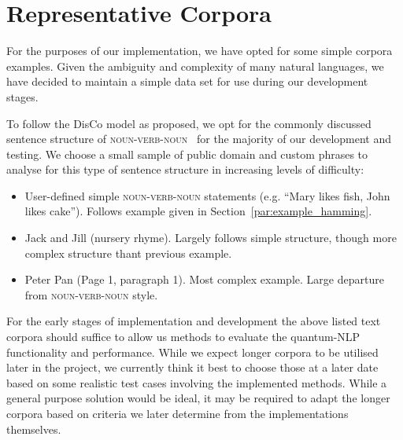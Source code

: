\section{Representative Corpora}
\label{sec:representative_corpora}
For the purposes of our implementation, we have opted for some simple corpora examples. Given the ambiguity and complexity of many natural languages, we have decided to maintain a simple data set for use during our development stages.

To follow the DisCo model as proposed, we opt for the commonly discussed sentence structure of \textsc{noun-verb-noun}~\cite{Zeng_Coecke_2016,Coecke_Sadrzadeh_Clark_2010} for the majority of our development and testing. We choose a small sample of public domain and custom phrases to analyse for this type of sentence structure in increasing levels of difficulty:
\begin{itemize}
    \item User-defined simple \textsc{noun-verb-noun} statements (e.g. ``Mary likes fish, John likes cake''). Follows example given in Section~\ref{par:example_hamming}.
    \item Jack and Jill (nursery rhyme). Largely follows simple structure, though more complex structure thant previous example.
    \item Peter Pan (Page 1, paragraph 1). Most complex example. Large departure from \textsc{noun-verb-noun} style.
\end{itemize}
For the early stages of implementation and development the above listed text corpora should suffice to allow us methods to evaluate the quantum-NLP functionality and performance. While we expect longer corpora to be utilised later in the project, we currently think it best to choose those at a later date based on some realistic test cases involving the implemented methods. While a general purpose solution would be ideal, it may be required to adapt the longer corpora based on criteria we later determine from the implementations themselves.



